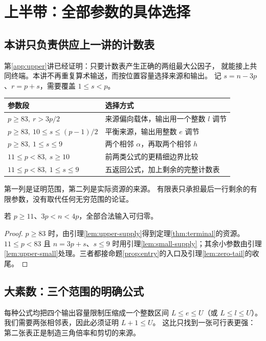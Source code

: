 \chapter{上半带：全部参数的具体选择}\label{ch:upper}

\section{本讲只负责供应上一讲的计数表}
第\ref{app:upper}讲已经证明：只要计数表产生正确的两组最大公因子，
就能接上共同终端。本讲不再重复算术输送，而按位置容量选择来源和输出。
记 $s=n-3p$、$r=p+s$，需要覆盖 $1\le s<p$。

\begin{center}
\begin{tabular}{p{}p{}}
\toprule 参数段 & 选择方式\\\midrule
$p\ge83,\ r>3p/2$ & 来源偏向载体，输出用一个整数 $l$ 调节\\
$p\ge83,\ 10\le s\le(p-1)/2$ & 平衡来源，输出用整数 $e$ 调节\\
$p\ge83,\ 1\le s\le9$ & 两个相邻 $\alpha$，再取两个相邻 $h$\\
$11\le p<83,\ s\ge10$ & 前两类公式的更精细边界比较\\
$11\le p<83,\ 1\le s\le9$ & 五返回公式，加上剩余的完整计数表\\
\bottomrule
\end{tabular}
\end{center}
第一列是证明范围，第二列是实际资源的来源。
有限表只承担最后一行剩余的有限参数，没有取代任何无穷范围的论证。

\begin{proposition}[上半带的充分性]\label{prop:upper}
若 $p\ge11$、$3p<n<4p$，全部合法输入可归零。
\end{proposition}
\begin{proof}
$p\ge83$ 时，由引理\ref{lem:upper-supply}得到定理\ref{thm:terminal}的资源。$11\le p<83$ 且 $n=3p+s$、$s\le9$ 时用引理\ref{lem:small-supply}；其余小参数由引理\ref{lem:upper-small}处理。三者都接命题\ref{prop:entry}的入口及引理\ref{lem:zero-tail}的收尾。
\end{proof}


\section{大素数：三个范围的明确公式}
每种公式均把四个输出容量限制压缩成一个整数区间 $L\le e\le U$（或 $L\le l\le U$）。
我们需要两张相邻表，因此必须证明 $L+1\le U$。
这比只找到一张可行表更强：第二张表正是制造三角倍率和剪切的来源。

